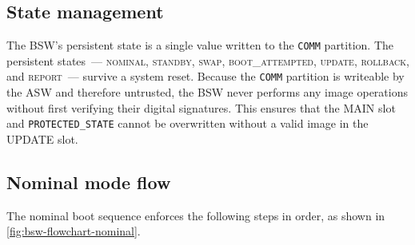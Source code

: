 \subsection{State management}
\label{subsection:implementation-flow-state}

The BSW's persistent state is a single value written to the \texttt{COMM} partition. The  persistent states~--- \textsc{nominal}, \textsc{standby}, \textsc{swap},  \textsc{boot\_attempted}, \textsc{update}, \textsc{rollback}, and \textsc{report}~--- survive a system reset. Because the \texttt{COMM} partition is writeable by the ASW and therefore untrusted, the BSW never performs any image operations without first verifying their digital signatures. This ensures that the MAIN slot and \texttt{PROTECTED\_STATE} cannot be overwritten without a valid image in the UPDATE slot.

\subsection{Nominal mode flow}
\label{subsection:implementation-flow-nominal}

The nominal boot sequence enforces the following steps in order, as shown in \autoref{fig:bsw-flowchart-nominal}.

